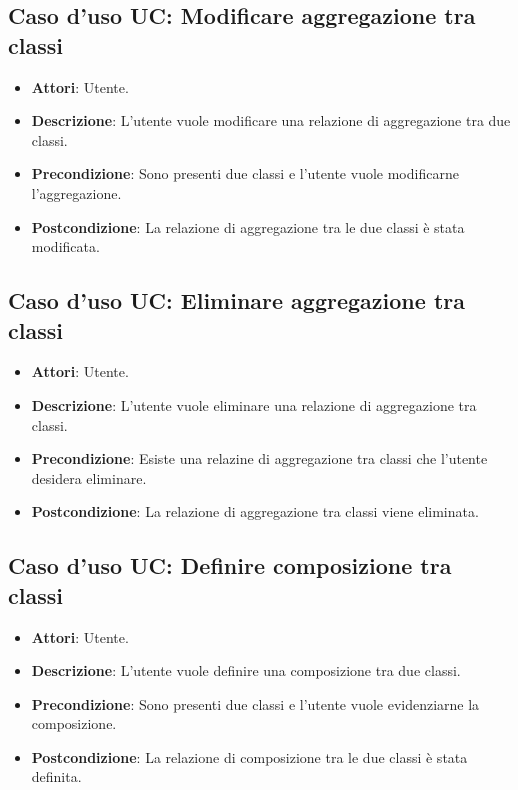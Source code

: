 \documentclass[../AnalisiDeiRequisiti.tex]{subfiles}
\begin{document}
		\subsection{Caso d'uso UC: Modificare aggregazione tra classi}
		\begin{itemize}
			\item\textbf{Attori}: Utente.
			\item\textbf{Descrizione}: L'utente vuole modificare una relazione di aggregazione tra due classi.
			\item\textbf{Precondizione}: Sono presenti due classi e l'utente vuole modificarne l'aggregazione.
			\item\textbf{Postcondizione}: La relazione di aggregazione tra le due classi è stata modificata.
		\end{itemize}
		
		\subsection{Caso d'uso UC: Eliminare aggregazione tra classi}
		\begin{itemize}
			\item\textbf{Attori}: Utente.
			\item\textbf{Descrizione}: L'utente vuole eliminare una relazione di aggregazione tra classi.
			\item\textbf{Precondizione}: Esiste una relazine di aggregazione tra classi che l'utente desidera eliminare.
			\item\textbf{Postcondizione}: La relazione di aggregazione tra classi viene eliminata.
		\end{itemize}
		
		\subsection{Caso d'uso UC: Definire composizione tra classi}
		\begin{itemize}
			\item\textbf{Attori}: Utente.
			\item\textbf{Descrizione}: L'utente vuole definire una composizione tra due classi.
			\item\textbf{Precondizione}: Sono presenti due classi e l'utente vuole evidenziarne la composizione.
			\item\textbf{Postcondizione}: La relazione di composizione tra le due classi è stata definita.
		\end{itemize}
		
\end{document}
